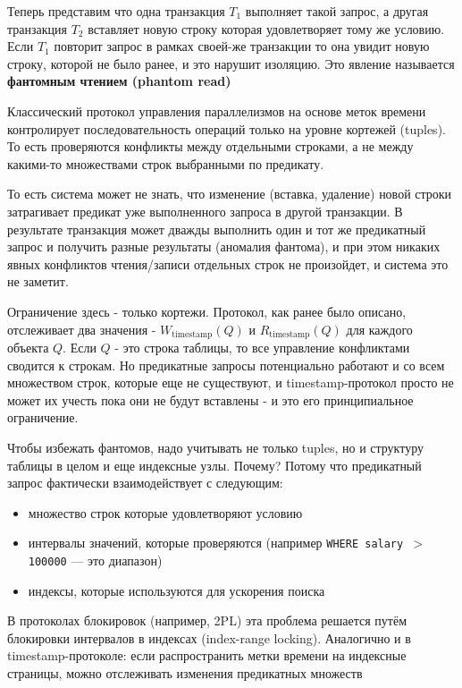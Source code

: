 Теперь представим что одна транзакция $T_1$ выполняет такой запрос, а другая транзакция $T_2$ вставляет новую строку которая удовлетворяет тому же условию. Если $T_1$ повторит запрос в рамках своей-же транзакции то она увидит новую строку, которой не было ранее, и это нарушит изоляцию. Это явление называется \textbf{фантомным чтением (phantom read)}

Классический протокол управления параллелизмов на основе меток времени контролирует последовательность операций только на уровне кортежей (tuples). То есть проверяются конфликты между отдельными строками, а не между какими-то множествами строк выбранными по предикату.

То есть система может не знать, что изменение (вставка, удаление) новой строки затрагивает предикат уже выполненного запроса в другой транзакции. В результате транзакция может дважды выполнить один и тот же предикатный запрос и получить разные результаты (аномалия фантома), и при этом никаких явных конфликтов чтения/записи отдельных строк не произойдет, и система это не заметит.

Ограничение здесь - только кортежи. Протокол, как ранее было описано, отслеживает два значения - $W_{\text{timestamp}}(Q)$ и $R_{\text{timestamp}}(Q)$ для каждого объекта $Q$. Если $Q$ - это строка таблицы, то все управление конфликтами сводится к строкам. Но предикатные запросы потенциально работают и со всем множеством строк, которые еще не существуют, и timestamp-протокол просто не может их учесть пока они не будут вставлены - и это его принципиальное ограничение.

Чтобы избежать фантомов, надо учитывать не только tuples, но и структуру таблицы в целом и еще индексные узлы. Почему?
Потому что предикатный запрос фактически взаимодействует с следующим:
\begin{itemize}
    \item множество строк которые удовлетворяют условию
    \item интервалы значений, которые проверяются (например \texttt{WHERE salary $>$ 100000} — это диапазон)
    \item индексы, которые используются для ускорения поиска
\end{itemize}

В протоколах блокировок (например, 2PL) эта проблема решается путём блокировки интервалов в индексах (index-range locking). Аналогично и в timestamp-протоколе: если распространить метки времени на индексные страницы, можно отслеживать изменения предикатных множеств \autocite{Silberschatz, ElmasriNavathe}

